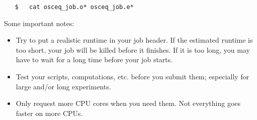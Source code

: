 \documentclass[a4paper]{article}
\begin{document}
%
\begin{verbatim}
   $   cat osceq_job.o* osceq_job.e*
\end{verbatim}
%
\par
Some important notes:
%
\begin{itemize}
	\item Try to put a realistic runtime in your job header. If the estimated runtime is too short, your job will be killed before it finishes. If it is too long, you may have to wait for a long time before your job starts.
	\item Test your scripts, computations, etc. before you submit them; especially for large and/or long experiments.
	\item Only request more CPU cores when you need them. Not everything goes faster on more CPUs.
\end{itemize}
%
\clearpage\appendix
\end{document}
